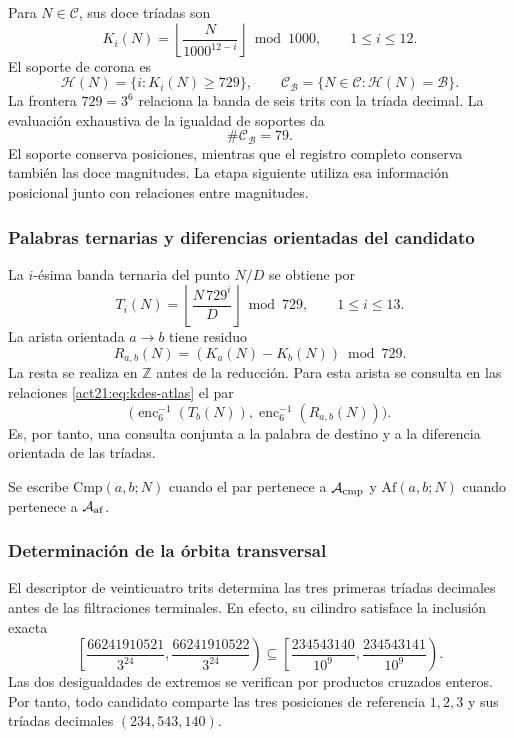 Para $N\in\mathcal C$, sus doce tríadas son
\begin{equation}
 K_i(N)=\left\lfloor\frac{N}{1000^{12-i}}\right\rfloor\bmod1000,
 \qquad1\leq i\leq12.
 \label{act21:eq:kdes-triadas}
\end{equation}
El soporte de corona es
\[
 \mathcal H(N)=\{i:K_i(N)\geq729\},
 \qquad
 \mathcal C_{\mathcal B}=\{N\in\mathcal C:\mathcal H(N)=\mathcal B\}.
\]
La frontera $729=3^6$ relaciona la banda de seis trits con la tríada
decimal. La evaluación exhaustiva de la igualdad de soportes da
\begin{equation}
 \#\mathcal C_{\mathcal B}=79.
 \label{act21:eq:kdes-79}
\end{equation}
El soporte conserva posiciones, mientras que el registro completo
conserva también las doce magnitudes. La etapa siguiente utiliza esa
información posicional junto con relaciones entre magnitudes.

\subsubsection{Palabras ternarias y diferencias orientadas del candidato}

La $i$-ésima banda ternaria del punto $N/D$ se obtiene por
\begin{equation}
 T_i(N)=\left\lfloor\frac{N\,729^i}{D}\right\rfloor\bmod729,
 \qquad1\leq i\leq13.
 \label{act21:eq:kdes-tercandidato}
\end{equation}
La arista orientada $a\to b$ tiene residuo
\begin{equation}
 R_{a,b}(N)=(K_a(N)-K_b(N))\bmod729.
 \label{act21:eq:kdes-resarista}
\end{equation}
La resta se realiza en $\mathbb Z$ antes de la reducción. Para esta
arista se consulta en las relaciones \eqref{act21:eq:kdes-atlas} el par
\[
 \bigl(\operatorname{enc}_6^{-1}(T_b(N)),
  \operatorname{enc}_6^{-1}(R_{a,b}(N))\bigr).
\]
Es, por tanto, una consulta
conjunta a la palabra de destino y a la diferencia orientada de las
tríadas.

Se escribe $\mathrm{Cmp}(a,b;N)$ cuando el par pertenece a
$\mathcal A_{\rm cmp}$ y $\mathrm{Af}(a,b;N)$ cuando pertenece a
$\mathcal A_{\rm af}$.

\subsubsection{Determinación de la órbita transversal}

El descriptor de veinticuatro trits determina las tres primeras
tríadas decimales antes de las filtraciones terminales. En efecto, su
cilindro satisface la inclusión exacta
\[
 \left[\frac{66241910521}{3^{24}},
       \frac{66241910522}{3^{24}}\right)
 \subseteq
 \left[\frac{234543140}{10^9},
       \frac{234543141}{10^9}\right).
\]
Las dos desigualdades de extremos se verifican por productos cruzados
enteros. Por tanto, todo candidato comparte las tres posiciones de
referencia $1,2,3$ y sus tríadas decimales $(234,543,140)$.

